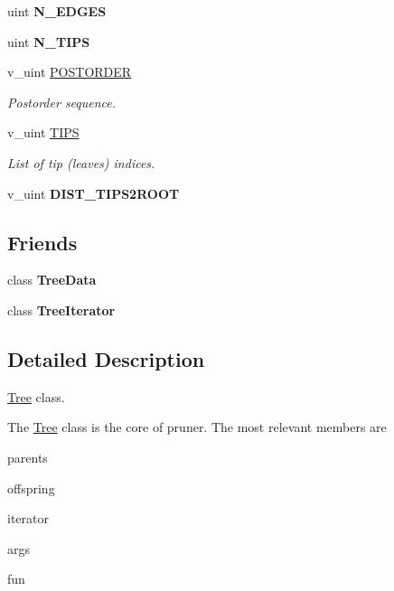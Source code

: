 \begin{DoxyCompactItemize}
uint {\bfseries N\+\_\+\+E\+D\+G\+ES}
\item 
\mbox{\label{classTree_afe09b17dd0f475dcbc4054892863050e}} 
uint {\bfseries N\+\_\+\+T\+I\+PS}
\item 
v\+\_\+uint \hyperlink{classTree_a310e76b803db38e7067514822b21a58f}{P\+O\+S\+T\+O\+R\+D\+ER}
\begin{DoxyCompactList}\small\item\em Postorder sequence. \end{DoxyCompactList}\item 
\mbox{\label{classTree_a486adc6260e94490b485e205e8e70b1f}} 
v\+\_\+uint \hyperlink{classTree_a486adc6260e94490b485e205e8e70b1f}{T\+I\+PS}
\begin{DoxyCompactList}\small\item\em List of tip (leaves) indices. \end{DoxyCompactList}\item 
\mbox{\label{classTree_af6b0afbf17f53ef49a43f9b640d92fde}} 
v\+\_\+uint {\bfseries D\+I\+S\+T\+\_\+\+T\+I\+P\+S2\+R\+O\+OT}
\end{DoxyCompactItemize}
\subsection*{Friends}
\begin{DoxyCompactItemize}
\item 
\mbox{\label{classTree_a3ef069a6a857ec671312e3f76cb5aa24}} 
class {\bfseries Tree\+Data}
\item 
\mbox{\label{classTree_a925e5a7f5dc110e63f7062d0e6898af9}} 
class {\bfseries Tree\+Iterator}
\end{DoxyCompactItemize}


\subsection{Detailed Description}
\hyperlink{classTree}{Tree} class. 

The \hyperlink{classTree}{Tree} class is the core of pruner. The most relevant members are
\begin{DoxyItemize}
\item {\ttfamily parents}
\item {\ttfamily offspring}
\item {\ttfamily iterator}
\item {\ttfamily args}
\item {\ttfamily fun} 
\end{DoxyItemize}

